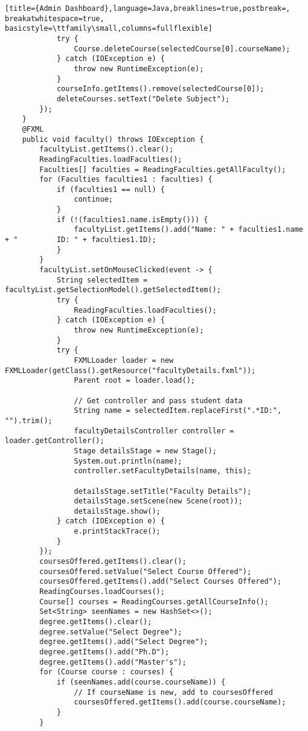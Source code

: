 \begin{lstlisting}[title={Admin Dashboard},language=Java,breaklines=true,postbreak=, breakatwhitespace=true, basicstyle=\ttfamily\small,columns=fullflexible]
            try {
                Course.deleteCourse(selectedCourse[0].courseName);
            } catch (IOException e) {
                throw new RuntimeException(e);
            }
            courseInfo.getItems().remove(selectedCourse[0]);
            deleteCourses.setText("Delete Subject");
        });
    }
    @FXML
    public void faculty() throws IOException {
        facultyList.getItems().clear();
        ReadingFaculties.loadFaculties();
        Faculties[] faculties = ReadingFaculties.getAllFaculty();
        for (Faculties faculties1 : faculties) {
            if (faculties1 == null) {
                continue;
            }
            if (!(faculties1.name.isEmpty())) {
                facultyList.getItems().add("Name: " + faculties1.name + "         ID: " + faculties1.ID);
            }
        }
        facultyList.setOnMouseClicked(event -> {
            String selectedItem = facultyList.getSelectionModel().getSelectedItem();
            try {
                ReadingFaculties.loadFaculties();
            } catch (IOException e) {
                throw new RuntimeException(e);
            }
            try {
                FXMLLoader loader = new FXMLLoader(getClass().getResource("facultyDetails.fxml"));
                Parent root = loader.load();

                // Get controller and pass student data
                String name = selectedItem.replaceFirst(".*ID:", "").trim();
                facultyDetailsController controller = loader.getController();
                Stage detailsStage = new Stage();
                System.out.println(name);
                controller.setFacultyDetails(name, this);

                detailsStage.setTitle("Faculty Details");
                detailsStage.setScene(new Scene(root));
                detailsStage.show();
            } catch (IOException e) {
                e.printStackTrace();
            }
        });
        coursesOffered.getItems().clear();
        coursesOffered.setValue("Select Course Offered");
        coursesOffered.getItems().add("Select Courses Offered");
        ReadingCourses.loadCourses();
        Course[] courses = ReadingCourses.getAllCourseInfo();
        Set<String> seenNames = new HashSet<>();
        degree.getItems().clear();
        degree.setValue("Select Degree");
        degree.getItems().add("Select Degree");
        degree.getItems().add("Ph.D");
        degree.getItems().add("Master's");
        for (Course course : courses) {
            if (seenNames.add(course.courseName)) {
                // If courseName is new, add to coursesOffered
                coursesOffered.getItems().add(course.courseName);
            }
        }


\end{lstlisting}

